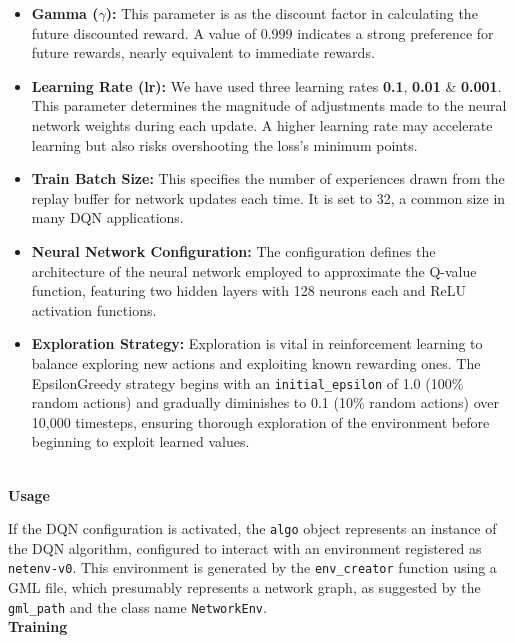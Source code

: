 \documentclass[conference]{IEEEtran}
\begin{document}
\begin{itemize}
    \item \textbf{Gamma ($\gamma$):} This parameter is as the discount factor in calculating the future discounted reward. A value of 0.999 indicates a strong preference for future rewards, nearly equivalent to immediate rewards.
    
    \item \textbf{Learning Rate (lr):} We have used three learning rates \textbf{0.1}, \textbf{0.01} \& \textbf{0.001}. This parameter determines the magnitude of adjustments made to the neural network weights during each update. A higher learning rate may accelerate learning but also risks overshooting the loss's minimum points.
    
    \item \textbf{Train Batch Size:} This specifies the number of experiences drawn from the replay buffer for network updates each time. It is set to 32, a common size in many DQN applications.
    
    \item \textbf{Neural Network Configuration:} The configuration defines the architecture of the neural network employed to approximate the Q-value function, featuring two hidden layers with 128 neurons each and ReLU activation functions.
    
    \item \textbf{Exploration Strategy:} Exploration is vital in reinforcement learning to balance exploring new actions and exploiting known rewarding ones. The EpsilonGreedy strategy begins with an \texttt{initial\_epsilon} of 1.0 (100\% random actions) and gradually diminishes to 0.1 (10\% random actions) over 10,000 timesteps, ensuring thorough exploration of the environment before beginning to exploit learned values.
\end{itemize}
\\\newline
{\textbf{Usage}}

If the DQN configuration is activated, the \texttt{algo} object represents an instance of the DQN algorithm, configured to interact with an environment registered as \texttt{netenv-v0}. This environment is generated by the \texttt{env\_creator} function using a GML file, which presumably represents a network graph, as suggested by the \texttt{gml\_path} and the class name \texttt{NetworkEnv}.
\\\newline
{\textbf{Training}}
\end{document}
